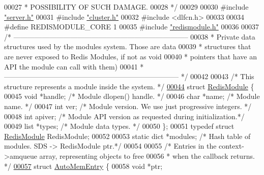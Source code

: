 \begin{DoxyCode}
00027 \textcolor{comment}{ * POSSIBILITY OF SUCH DAMAGE.}
00028 \textcolor{comment}{ */}
00029 
00030 \textcolor{preprocessor}{#}\textcolor{preprocessor}{include} \hyperlink{server_8h}{"server.h"}
00031 \textcolor{preprocessor}{#}\textcolor{preprocessor}{include} \hyperlink{cluster_8h}{"cluster.h"}
00032 \textcolor{preprocessor}{#}\textcolor{preprocessor}{include} \textcolor{preprocessor}{<}\textcolor{preprocessor}{dlfcn}\textcolor{preprocessor}{.}\textcolor{preprocessor}{h}\textcolor{preprocessor}{>}
00033 
00034 \textcolor{preprocessor}{#}\textcolor{preprocessor}{define} \textcolor{preprocessor}{REDISMODULE\_CORE} 1
00035 \textcolor{preprocessor}{#}\textcolor{preprocessor}{include} \hyperlink{redismodule_8h}{"redismodule.h"}
00036 
00037 \textcolor{comment}{/* --------------------------------------------------------------------------}
00038 \textcolor{comment}{ * Private data structures used by the modules system. Those are data}
00039 \textcolor{comment}{ * structures that are never exposed to Redis Modules, if not as void}
00040 \textcolor{comment}{ * pointers that have an API the module can call with them)}
00041 \textcolor{comment}{ * -------------------------------------------------------------------------- */}
00042 
00043 \textcolor{comment}{/* This structure represents a module inside the system. */}
\hyperlink{structRedisModule}{00044} \textcolor{keyword}{struct} \hyperlink{structRedisModule}{RedisModule} \{
00045     \textcolor{keywordtype}{void} *handle;   \textcolor{comment}{/* Module dlopen() handle. */}
00046     \textcolor{keywordtype}{char} *name;     \textcolor{comment}{/* Module name. */}
00047     \textcolor{keywordtype}{int} ver;        \textcolor{comment}{/* Module version. We use just progressive integers. */}
00048     \textcolor{keywordtype}{int} apiver;     \textcolor{comment}{/* Module API version as requested during initialization.*/}
00049     list *types;    \textcolor{comment}{/* Module data types. */}
00050 \};
00051 \textcolor{keyword}{typedef} \textcolor{keyword}{struct} \hyperlink{structRedisModule}{RedisModule} RedisModule;
00052 
00053 \textcolor{keyword}{static} dict *modules; \textcolor{comment}{/* Hash table of modules. SDS -> RedisModule ptr.*/}
00054 
00055 \textcolor{comment}{/* Entries in the context->amqueue array, representing objects to free}
00056 \textcolor{comment}{ * when the callback returns. */}
\hyperlink{structAutoMemEntry}{00057} \textcolor{keyword}{struct} \hyperlink{structAutoMemEntry}{AutoMemEntry} \{
00058     \textcolor{keywordtype}{void} *ptr;

\end{DoxyCode}
